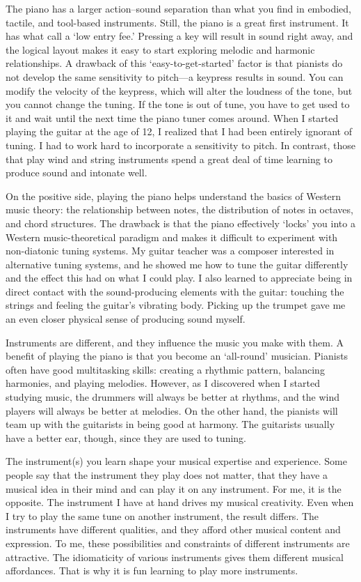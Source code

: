The piano has a larger action--sound separation than what you find in embodied, tactile, and tool-based instruments. Still, the piano is a great first instrument. It has what \citet{wessel_problems_2002} call a `low entry fee.' Pressing a key will result in sound right away, and the logical layout makes it easy to start exploring melodic and harmonic relationships. A drawback of this `easy-to-get-started' factor is that pianists do not develop the same sensitivity to pitch---a keypress results in sound. You can modify the velocity of the keypress, which will alter the loudness of the tone, but you cannot change the tuning. If the tone is out of tune, you have to get used to it and wait until the next time the piano tuner comes around. When I started playing the guitar at the age of 12, I realized that I had been entirely ignorant of tuning. I had to work hard to incorporate a sensitivity to pitch. In contrast, those that play wind and string instruments spend a great deal of time learning to produce sound and intonate well.

On the positive side, playing the piano helps understand the basics of Western music theory: the relationship between notes, the distribution of notes in octaves, and chord structures. The drawback is that the piano effectively `locks' you into a Western music-theoretical paradigm and makes it difficult to experiment with non-diatonic tuning systems. My guitar teacher was a composer interested in alternative tuning systems, and he showed me how to tune the guitar differently and the effect this had on what I could play. I also learned to appreciate being in direct contact with the sound-producing elements with the guitar: touching the strings and feeling the guitar's vibrating body. Picking up the trumpet gave me an even closer physical sense of producing sound myself.

Instruments are different, and they influence the music you make with them. A benefit of playing the piano is that you become an `all-round' musician. Pianists often have good multitasking skills: creating a rhythmic pattern, balancing harmonies, and playing melodies. However, as I discovered when I started studying music, the drummers will always be better at rhythms, and the wind players will always be better at melodies. On the other hand, the pianists will team up with the guitarists in being good at harmony. The guitarists usually have a better ear, though, since they are used to tuning.

The instrument(s) you learn shape your musical expertise and experience.
Some people say that the instrument they play does not matter, that they have a musical idea in their mind and can play it on any instrument. For me, it is the opposite. The instrument I have at hand drives my musical creativity. Even when I try to play the same tune on another instrument, the result differs. The instruments have different qualities, and they afford other musical content and expression. To me, these possibilities and constraints of different instruments are attractive. The idiomaticity of various instruments gives them different musical affordances. That is why it is fun learning to play more instruments.

